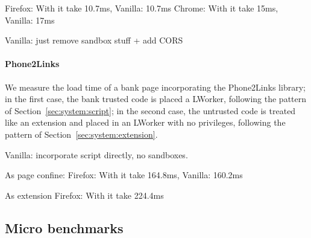 Firefox: With \sys{} it take 10.7ms, Vanilla:  10.7ms
Chrome: With \sys{} it take 15ms, Vanilla:  17ms

Vanilla: just remove sandbox stuff + add CORS

\paragraph{Phone2Links}

We measure the load time of a bank page incorporating the Phone2Links library;
in the first case, the bank trusted code is placed a LWorker, following the
pattern of Section~\ref{sec:system:script}; in the second case, the untrusted
code is treated like an extension and placed in an LWorker with no privileges,
following the pattern of Section~\ref{sec:system:extension}.

Vanilla: incorporate script directly, no sandboxes.


As page confine:
Firefox: With \sys{} it take 164.8ms, Vanilla:  160.2ms

As extension
Firefox: With \sys{} it take 224.4ms

\subsection{Micro benchmarks}
\label{sec:eval:micro}

\newcommand*\rot{\rotatebox{90}}

